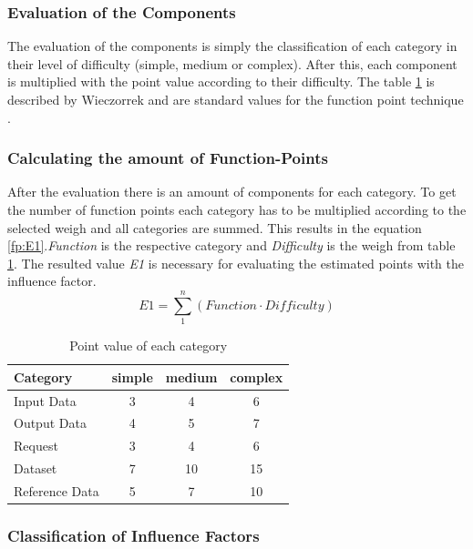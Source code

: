 \subsubsection{Evaluation of the Components}

The evaluation of the components is simply the classification of each category in their level of difficulty (simple, medium or complex). After this, each component is multiplied with the point value according to their difficulty. The table \ref{tab:pointvalues} is described by Wieczorrek and are standard values for the function point technique \cite{fpafundamentals}.

\subsubsection{ Calculating the amount of Function-Points}

After the evaluation there is an amount of components for each category. To get the number of function points each category has to be multiplied according to the selected weigh and all categories are summed. This results in the equation \ref{fp:E1}.\textit{Function} is the respective category and \textit{Difficulty} is the weigh from table \ref{tab:pointvalues}. The resulted value \textit{E1} is necessary for evaluating the estimated points with the influence factor.
\begin{equation}
	\textit{E1} =  \sum \limits_{1}^n  (\textit{Function} \cdot \textit{Difficulty}) \label{fp:E1}
\end{equation}
\begin{table}[h] 
	\centering 
	\setlength{\tabcolsep}{4pt}
	\begin{tabular}{|l|c|c|c|}\hline
		Category & simple & medium & complex \\ \hline
		Input Data & 3 & 4 & 6\\ \hline
		Output Data & 4 & 5 & 7\\ \hline
		Request & 3 & 4 & 6\\ \hline
		Dataset & 7 & 10 & 15\\ \hline
		Reference Data & 5 & 7 & 10\\ \hline
	\end{tabular}
	\caption{Point value of each category} 
	\label{tab:pointvalues} 
\end{table}
\subsubsection{ Classification of Influence Factors}\label{fp:classificationInfluence}

